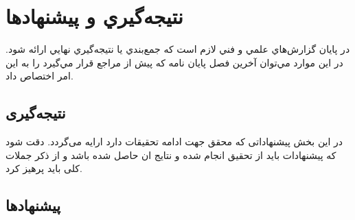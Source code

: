 \chapter{نتيجه‌گيري و پیشنهادها}
در پايان گزارش‌هاي علمي و فني لازم است كه جمع‌بندي يا نتيجه‌گيري نهايي ارائه شود. در اين موارد مي‌توان آخرين فصل پایان نامه كه پیش از مراجع قرار مي‌گيرد را به اين امر اختصاص داد.
\section{نتیجه‌گیری}
در این بخش پیشنهاداتی که محقق جهت ادامه تحقیقات دارد ارایه می‌گردد. دقت شود که پیشنهادات باید از  تحقیق انجام شده و نتایج ان حاصل شده باشد و از ذکر جملات کلی باید پرهیز کرد.

\section{پیشنهادها}

